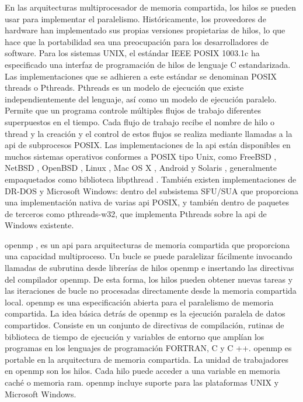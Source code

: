 En las arquitecturas multiprocesador de memoria compartida, los hilos se pueden usar para implementar el paralelismo. Históricamente, los proveedores de hardware han implementado sus propias versiones propietarias de hilos, lo que hace que la portabilidad sea una preocupación para los desarrolladores de software. Para los sistemas UNIX, el estándar IEEE POSIX 1003.1c ha especificado una interfaz de programación de hilos de lenguaje C estandarizada. Las implementaciones que se adhieren a este estándar se denominan POSIX threads o Pthreads. Pthreads \cite{nichols1996pthreads} es un modelo de ejecución que existe independientemente del lenguaje, así como un modelo de ejecución paralelo. Permite que un programa controle múltiples flujos de trabajo diferentes superpuestos en el tiempo. Cada flujo de trabajo recibe el nombre de hilo o thread y la creación y el control de estos flujos se realiza mediante llamadas a la \acrshort{api} de subprocesos POSIX. Las implementaciones de la \acrshort{api} están disponibles en muchos sistemas operativos conformes a POSIX tipo Unix, como FreeBSD , NetBSD , OpenBSD , Linux , Mac OS X , Android y Solaris , generalmente empaquetados como biblioteca libpthread . También existen implementaciones de DR-DOS y Microsoft Windows: dentro del subsistema SFU/SUA que proporciona una implementación nativa de varias \acrshort{api} POSIX, y también dentro de paquetes de terceros como pthreads-w32, que implementa Pthreads sobre la \acrshort{api} de Windows existente.

 \acrshort{openmp} \cite{dagum1998openmp}, es un \acrshort{api} para arquitecturas de memoria compartida que proporciona una capacidad multiproceso. Un bucle se puede paralelizar fácilmente invocando llamadas de subrutina desde librerías de hilos \acrshort{openmp} e insertando las directivas del compilador  \acrshort{openmp}. De esta forma, los hilos pueden obtener nuevas tareas y las iteraciones de bucle no procesadas directamente desde la memoria compartida local. \acrshort{openmp} es una especificación abierta para el paralelismo de memoria compartida. La idea básica detrás de \acrshort{openmp} es la ejecución paralela de datos compartidos. Consiste en un conjunto de directivas de compilación, rutinas de biblioteca de tiempo de ejecución y variables de entorno que amplían los programas en los lenguajes de programación FORTRAN, C y C ++. \acrshort{openmp} es portable en la arquitectura de memoria compartida. La unidad de trabajadores en \acrshort{openmp} son los hilos. Cada hilo puede acceder a una variable en memoria caché o memoria \acrshort{ram}. \acrshort{openmp} incluye suporte para las plataformas UNIX y Microsoft Windows. 

